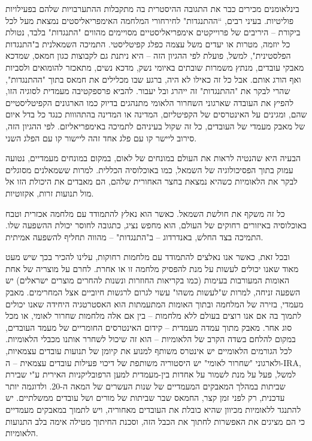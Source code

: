 בינלאומנים מכירים כבר את התגובה ההיסטרית בה מתקבלות ההתערבויות שלהם בפעילויות פוליטיות. בעיני רבים, “ההתנגדות" לחירחורי המלחמה האימפריאליסטים נמצאת מעל לכל ביקורת – היריבים של פרוייקטים אימפריאליסטיים מסויימים מהווים "התנגדות" בלבד, נטולת כל יוזמה, מטרות או יעדים משל עצמה כפלג קפיטליסטי. התמיכה השמאלנית ב"התנגדות הפלסטינית", למשל, פועלת לפי ההגיון הזה – היא ניתנת גם לקבוצות כגון חמאס, שמדכא מאבקי עובדים, מנתץ משמרות שובתים באיומי נשק, מדכא נשים, מתאכזר להומואים ולסביות ואף הורג אותם. אבל כל זה כאילו לא היה, ברגע שבו מכלילים את חמאס בתוך "ההתנגדות", שהרי לבקר את "ההתנגדות" זה ייהרג ובל יעבור. להביא פרספקטיבה מעמדית לסוגיה הזו, להפיץ את העובדה שארגוני השחרור הלאומי מתנהגים בדיוק כמו הארגונים הקפיטליסטיים שהם, ומגינים על האינטרסים של הקפיטליזם, המדינה או המדינה בהתהווות כנגד כל בדל איום של מאבק מעמדי של העובדים, כל זה שקול בעיניהם לתמיכה באימפריאליזם. לפי ההגיון הזה, סירוב ליישר קו עם פלג אחד זהה ליישור קו עם הפלג השני.

הבעיה היא שהנטיה לראות את העולם במונחים של לאום, במקום במונחים מעמדיים, נטועה עמוק בתוך הפסיכולוגיה של השמאל, כמו באוכלוסיה הכללית. למרות ששמאלנים מסוגלים לבקר את הלאומיות כשהיא נמצאת בחצר האחורית שלהם, הם מאבדים את היכולת הזו אל מול תנועות זרות, אקזוטיות.

כל זה משקף את חולשת השמאל. כאשר הוא נאלץ להתמודד עם מלחמה אכזרית וטבח באוכלוסיה באיזורים רחוקים של העולם, הוא מחפש נציג, כתגובה לחוסר יכולת ההשפעה שלו. התמיכה בצד החלש, באנדרדוג – ב"התנגדות" – מהווה תחליף להשפעה אמיתית.

ובכל זאת, כאשר אנו נאלצים להתמודד עם מלחמות רחוקות, עלינו להכיר בכך שיש מעט מאוד שאנו יכולים לעשות על מנת להפסיק מלחמה זו או אחרת. לחרם על מוצריה של אחת האומות המעורבות בעימות (כמו בקריאות החוזרות ונשנות להחרים מוצרים ישראלים) יש השפעה זניחה, למרות ש"לעשות משהו" עשוי לגרום לרגשות חיוביים אצל המחרימים. מאבק מעמדי, בזירה של המלחמה ובתוך האומות המתעמתות הוא האסטרטגיה היחידה שאנו יכולים לתמוך בה אם אנו רוצים בעולם ללא מלחמות – בין אם אלה מלחמות שחרור לאומי, או מכל סוג אחר. מאבק מתוך עמדה מעמדית – קידום האינטרסים החומריים של מעמד העובדים, במקום להלחם בשדה הקרב של הלאומיות – הוא זה שיכול לשחרר אותנו מכבלי הלאומיות. לכל הגורמים הלאומיים יש אינטרס משותף למנוע את קיומן של תנועות עובדים עצמאיות, ולארגוני "שחרור לאומי" יש היסטוריה משותפת של דיכוי פעילות עובדים עצמאית – ה-IRA, למשל, פעל על מנת לשמור על אחדות בין-מעמדית למען הרפובליקניות האירית ע"י שבירת שביתות במהלך המאבקים המעמדיים של שנות העשרים של המאה ה-20. ולדוגמה יותר עדכנית, רק לפני זמן קצר, החמאס שבר שביתות של מורים ושל עובדים ממשלתיים. יש להתנגד ללאומיות מכיוון שהיא כובלת את העובדים מאחוריה, ויש לתמוך במאבקים מעמדיים כי הם מציגים את האפשרות לחתוך את הכבל הזה, וסכנת החיתוך מטילה אימה בלב התנועות הלאומיות.

